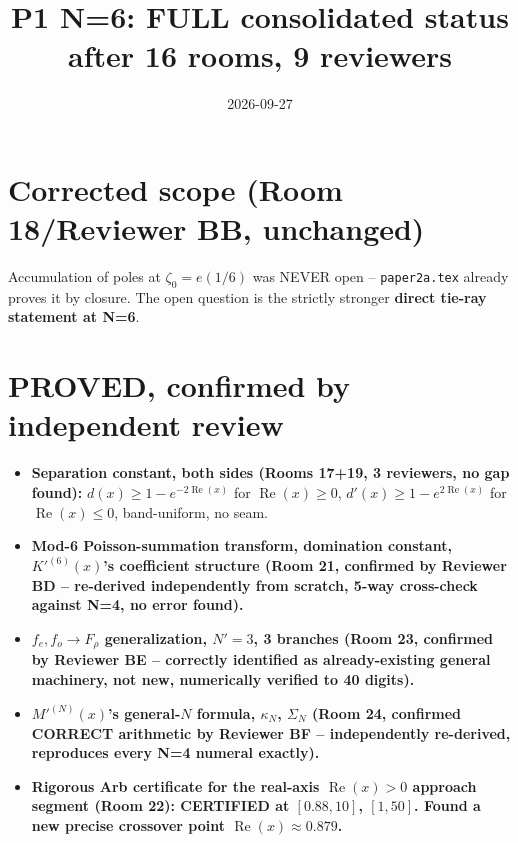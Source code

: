\documentclass[11pt]{article}
\title{P1 N=6: FULL consolidated status after 16 rooms, 9 reviewers}
\date{2026-09-27}
\begin{document}
\maketitle

\section*{Corrected scope (Room 18/Reviewer BB, unchanged)}
Accumulation of poles at $\zeta_0=e(1/6)$ was NEVER open -- \texttt{paper2a.tex} already proves it
by closure. The open question is the strictly stronger \textbf{direct tie-ray statement at N=6}.

\section*{PROVED, confirmed by independent review}
\begin{itemize}
\item \textbf{Separation constant, both sides (Rooms 17+19, 3 reviewers, no gap found):}
$d(x)\ge1-e^{-2\operatorname{Re}(x)}$ for $\operatorname{Re}(x)\ge0$,
$d'(x)\ge1-e^{2\operatorname{Re}(x)}$ for $\operatorname{Re}(x)\le0$, band-uniform, no seam.
\item \textbf{Mod-6 Poisson-summation transform, domination constant, $K'^{(6)}(x)$'s
coefficient structure (Room 21, confirmed by Reviewer BD -- re-derived independently from scratch,
5-way cross-check against N=4, no error found).}
\item \textbf{$f_e,f_o\to F_\rho$ generalization, $N'=3$, 3 branches (Room 23, confirmed by
Reviewer BE -- correctly identified as already-existing general machinery, not new, numerically
verified to 40 digits).}
\item \textbf{$M'^{(N)}(x)$'s general-$N$ formula, $\kappa_N$, $\Sigma_N$ (Room 24, confirmed
CORRECT arithmetic by Reviewer BF -- independently re-derived, reproduces every N=4 numeral
exactly).}
\item \textbf{Rigorous Arb certificate for the real-axis $\operatorname{Re}(x)>0$ approach segment
(Room 22): CERTIFIED at $[0.88,10]$, $[1,50]$. Found a new precise crossover point
$\operatorname{Re}(x)\approx0.879$.}
\end{itemize}
\end{document}
